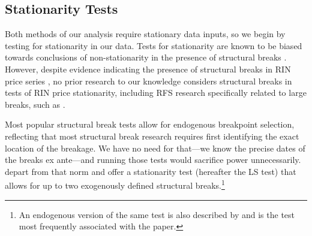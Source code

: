 \documentclass[11pt]{article}
\begin{document}
\begin{table}[h]
	\caption{Firm Characteristics with Ticker Symbols}
	\label{bins}
	\centering
\end{table}


\subsection{Stationarity Tests}

Both methods of our analysis require stationary data inputs, so we begin by testing for stationarity in our data. Tests for stationarity are known to be biased towards conclusions of non-stationarity in the presence of structural breaks \citep{Perron1989}. However, despite evidence indicating the presence of structural breaks in RIN price series \citep{Mason2016,Lade2018a}, no prior research to our knowledge considers structural breaks in tests of RIN price stationarity, including RFS research specifically related to large breaks, such as \cite{Lade2018a}. 

Most popular structural break tests allow for endogenous breakpoint selection, reflecting that most structural break research requires first identifying the exact location of the breakage. We have no need for that---we know the precise dates of the breaks ex ante---and running those tests would sacrifice power unnecessarily. \cite{Lee2003} depart from that norm and offer a stationarity test (hereafter the LS test) that allows for up to two exogenously defined structural breaks.\footnote{An endogenous version of the same test is also described by \cite{Lee2003} and is the test most frequently associated with the paper.}
\end{document}
